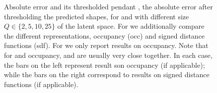 \begin{figure}
  \caption{Absolute error \Abs and its thresholded pendant
  \AbsThr, \ie the absolute error after thresholding the predicted shapes,
  for \PPCA and \VAE with different size $Q \in \{2,5,10,25\}$ of the
  latent space. For \VAE we additionally compare the different representations,
  \ie occupancy (occ) and signed distance functions (sdf). For \PPCA we only
  report results on occupancy. Note that
  for \VAEs and occupancy, \Abs and \AbsThr are usually very close together.
  In each case, the bars on the left represent result son occupancy (if applicable);
  while the bars on the right correspond to results on signed distance functions
  (if applicable).}
  \label{fig:experiments-2d-ppca}
\end{figure}
